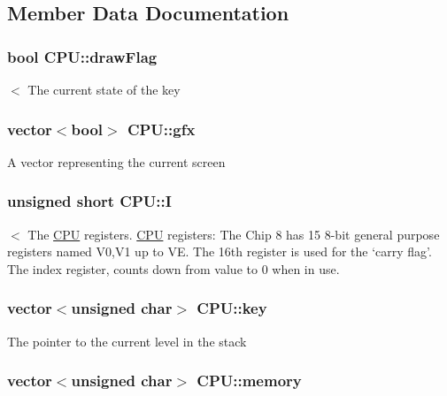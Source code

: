 \subsection{Member Data Documentation}
\hypertarget{classCPU_adccd58a3784f03ab908982b072139c1a}{
\subsubsection[{draw\-Flag}]{\setlength{\rightskip}{0pt plus 5cm}bool C\-P\-U\-::draw\-Flag\hspace{0.3cm}{\ttfamily [private]}}}\label{classCPU_adccd58a3784f03ab908982b072139c1a}
$<$ The current state of the key \hypertarget{classCPU_af5dd2f68fb212c8c39fad8522536c8aa}{
\subsubsection[{gfx}]{\setlength{\rightskip}{0pt plus 5cm}vector$<$bool$>$ C\-P\-U\-::gfx\hspace{0.3cm}{\ttfamily [private]}}}\label{classCPU_af5dd2f68fb212c8c39fad8522536c8aa}
A vector representing the current screen \hypertarget{classCPU_adf1fd15edb984e81a9f7adda264aa77a}{
\subsubsection[{I}]{\setlength{\rightskip}{0pt plus 5cm}unsigned short C\-P\-U\-::\-I\hspace{0.3cm}{\ttfamily [private]}}}\label{classCPU_adf1fd15edb984e81a9f7adda264aa77a}
$<$ The \hyperlink{classCPU}{C\-P\-U} registers. \hyperlink{classCPU}{C\-P\-U} registers\-: The Chip 8 has 15 8-\/bit general purpose registers named V0,V1 up to V\-E. The 16th register is used for the ‘carry flag’. The index register, counts down from value to 0 when in use. \hypertarget{classCPU_a043e3d085471f4edd7dded7d6b5c399f}{
\subsubsection[{key}]{\setlength{\rightskip}{0pt plus 5cm}vector$<$unsigned char$>$ C\-P\-U\-::key\hspace{0.3cm}{\ttfamily [private]}}}\label{classCPU_a043e3d085471f4edd7dded7d6b5c399f}
The pointer to the current level in the stack \hypertarget{classCPU_ab3122e590fe92912f56e1dc5192b9a39}{
\subsubsection[{memory}]{\setlength{\rightskip}{0pt plus 5cm}vector$<$unsigned char$>$ C\-P\-U\-::memory\hspace{0.3cm}{\ttfamily [private]}}}\label{classCPU_ab3122e590fe92912f56e1dc5192b9a39}
